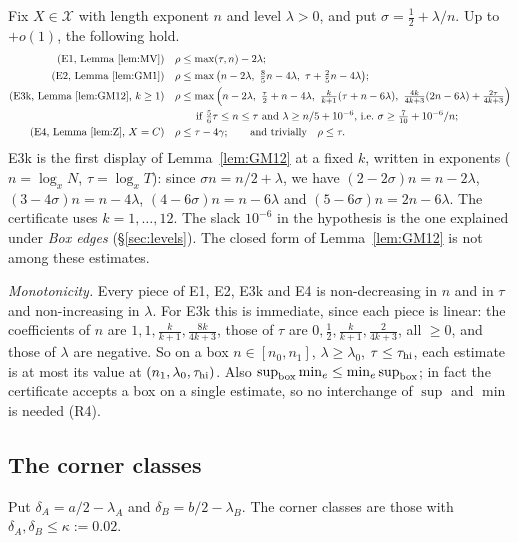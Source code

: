 \documentclass[11pt]{amsart}
\theoremstyle{definition}
\theoremstyle{remark}
\newcommand{\cX}{\mathcal{X}}
\begin{document}
Fix $X\in\cX$ with length exponent $n$ and level $\lambda>0$, and put $\sigma=\frac12+\lambda/n$. Up to $+o(1)$, the following hold.
\begin{align*}
\text{(E1, Lemma~\ref{lem:MV})}\quad&\rho\le\max(\tau,n)-2\lambda;\\
\text{(E2, Lemma~\ref{lem:GM1})}\quad&\rho\le\max\big(n-2\lambda,\ \tfrac85n-4\lambda,\ \tau+\tfrac25n-4\lambda\big);\\
\text{(E3k, Lemma~\ref{lem:GM12}, $k\ge1$)}\quad&\rho\le\max\Big(n-2\lambda,\ \tfrac\tau2+n-4\lambda,\ \tfrac{k}{k+1}(\tau+n-6\lambda),\
\tfrac{4k}{4k+3}(2n-6\lambda)+\tfrac{2\tau}{4k+3}\Big)\\
&\qquad\text{if }\tfrac56\tau\le n\le\tau\text{ and }\lambda\ge n/5+10^{-6}\text{, i.e.\ }\sigma\ge\tfrac7{10}+10^{-6}/n;\\
\text{(E4, Lemma~\ref{lem:Z}, $X=C$)}\quad&\rho\le\tau-4\gamma;\qquad\text{and trivially}\quad\rho\le\tau.
\end{align*}
E3k is the first display of Lemma~\ref{lem:GM12} at a fixed $k$, written in exponents ($n=\log_xN$, $\tau=\log_xT$): since $\sigma n=n/2+\lambda$,
we have $(2-2\sigma)n=n-2\lambda$, $(3-4\sigma)n=n-4\lambda$, $(4-6\sigma)n=n-6\lambda$ and $(5-6\sigma)n=2n-6\lambda$.
The certificate uses $k=1,\dots,12$. The slack $10^{-6}$ in the hypothesis is the one explained under \emph{Box edges} (\S\ref{sec:levels}).
The closed form of Lemma~\ref{lem:GM12} is not among these estimates.

\emph{Monotonicity.} Every piece of E1, E2, E3k and E4 is non-decreasing in $n$ and in $\tau$ and non-increasing in $\lambda$. For E3k this is
immediate, since each piece is linear: the coefficients of $n$ are $1,1,\frac{k}{k+1},\frac{8k}{4k+3}$, those of $\tau$ are
$0,\frac12,\frac{k}{k+1},\frac{2}{4k+3}$, all $\ge0$, and those of $\lambda$ are negative. So on a box $n\in[n_0,n_1]$, $\lambda\ge\lambda_0$,
$\tau\le\tau_{\rm hi}$, each estimate is at most its value at $(n_1,\lambda_0,\tau_{\rm hi})$. Also $\sup_{\rm box}\min_e\le\min_e\sup_{\rm box}$;
in fact the certificate accepts a box on a single estimate, so no interchange of $\sup$ and $\min$ is needed (R4).

\subsection{The corner classes}\label{sec:corner}

Put $\delta_A=a/2-\lambda_A$ and $\delta_B=b/2-\lambda_B$. The corner classes are those with $\delta_A,\delta_B\le\kappa:=0.02$.
\end{document}
